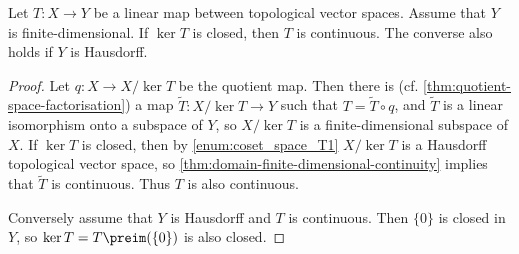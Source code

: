 \documentclass[article, a4paper, 11pt, oneside]{memoir}
\numberwithin{equation}{chapter}
\begin{document}
\begin{theorem}
    Let $T \colon X \to Y$ be a linear map between topological vector spaces. Assume that $Y$ is finite-dimensional. If $\ker T$ is closed, then $T$ is continuous. The converse also holds if $Y$ is Hausdorff.
\end{theorem}

\begin{proof}
    Let $q \colon X \to X/\ker T$ be the quotient map. Then there is (cf. \cref{thm:quotient-space-factorisation}) a map $\tilde{T} \colon X/\ker T \to Y$ such that $T = \tilde{T} \circ q$, and $\tilde{T}$ is a linear isomorphism onto a subspace of $Y$, so $X/\ker T$ is a finite-dimensional subspace of $X$. If $\ker T$ is closed, then by \cref{enum:coset_space_T1} $X/\ker T$ is a Hausdorff topological vector space, so \cref{thm:domain-finite-dimensional-continuity} implies that $\tilde{T}$ is continuous. Thus $T$ is also continuous.

    Conversely assume that $Y$ is Hausdorff and $T$ is continuous. Then $\{0\}$ is closed in $Y$, so $\ker T = T\preim(\{0\})$ is also closed.
\end{proof}




\end{document}

